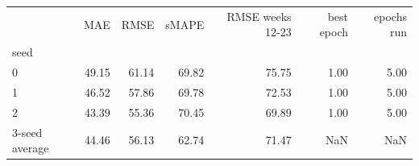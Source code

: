 \begin{tabular}{lrrrrrr}
\toprule
 & MAE & RMSE & sMAPE & RMSE weeks 12-23 & best epoch & epochs run \\
seed &  &  &  &  &  &  \\
\midrule
0 & 49.15 & 61.14 & 69.82 & 75.75 & 1.00 & 5.00 \\
1 & 46.52 & 57.86 & 69.78 & 72.53 & 1.00 & 5.00 \\
2 & 43.39 & 55.36 & 70.45 & 69.89 & 1.00 & 5.00 \\
3-seed average & 44.46 & 56.13 & 62.74 & 71.47 & NaN & NaN \\
\bottomrule
\end{tabular}
